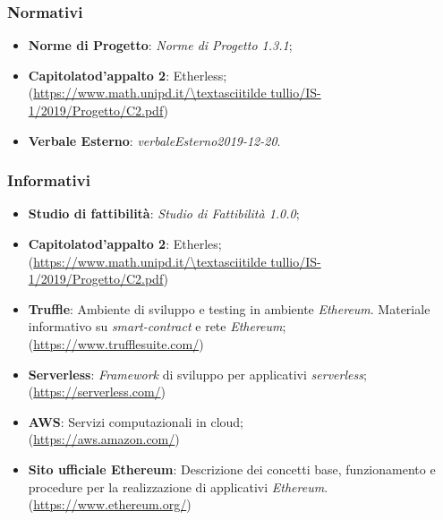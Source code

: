 \subsubsection{Normativi}
	\begin{itemize}
		\item \textbf{Norme di Progetto}: \textit{Norme di Progetto 1.3.1\docs};
		\item \textbf{Capitolato\glo d'appalto 2}: Etherless;\\ 
			(\url{https://www.math.unipd.it/\textasciitilde tullio/IS-1/2019/Progetto/C2.pdf})
		\item \textbf{Verbale Esterno}: \textit{verbaleEsterno2019-12-20}.
	\end{itemize}
\subsubsection{Informativi}
\begin{itemize}
	\item \textbf{Studio di fattibilità}: \textit{Studio di Fattibilità 1.0.0\docs};
    \item \textbf{Capitolato\glo d'appalto 2}: Etherles;\\ 
			(\url{https://www.math.unipd.it/\textasciitilde tullio/IS-1/2019/Progetto/C2.pdf})
	\item \textbf{Truffle}:  Ambiente di sviluppo e testing in ambiente \textit{Ethereum\glos}. Materiale informativo su \textit{smart-contract\glo} e rete \textit{Ethereum\glos};
		\\ (\url{https://www.trufflesuite.com/})
	\item \textbf{Serverless\glos}:  \textit{Framework\glo} di sviluppo per applicativi \textit{serverless\glos};\\ (\url{https://serverless.com/})
	\item \textbf{AWS}: Servizi computazionali in cloud; \\ (\url{https://aws.amazon.com/})
	\item \textbf{Sito ufficiale Ethereum\glo}: Descrizione dei concetti base, funzionamento e procedure per la realizzazione di applicativi \textit{Ethereum\glos}.
\\ (\url {https://www.ethereum.org/})
\end{itemize}

	
	
	